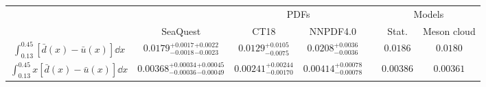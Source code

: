 \renewcommand{\arraystretch}{1.5}
\begin{tabular}{ccccccc}
\hline \hline
 &          & \multicolumn{2}{c}{PDFs} & & \multicolumn{2}{c}{Models} \\ \cline{3-4} \cline{6-7}
 & SeaQuest & CT18      & NNPDF4.0     & & Stat.     & Meson cloud    \\ \hline
$\int^{0.45}_{0.13} \left[\bar{d}\left(x\right) - \bar{u}\left(x\right) \right]\dd{x}$ &
  $0.0179_{-0.0018}^{+0.0017} {}_{-0.0023}^{+0.0022}$ &
  $0.0129^{+0.0105}_{-0.0075}$ &
  $0.0208^{+0.0036}_{-0.0036}$ & &
  $0.0186$ &
  $0.0180$ \\
$\int^{0.45}_{0.13} x\left[\bar{d}\left(x\right) - \bar{u}\left(x\right) \right]\dd{x}$ &
  $0.00368_{-0.00036}^{+0.00034} {}_{-0.00049}^{+0.00045}$ &
  $0.00241^{+0.00244}_{-0.00170}$ &
  $0.00414^{+0.00078}_{-0.00078}$ & &
  $0.00386$ &
  $0.00361$ \\ \hline \hline
\end{tabular}
